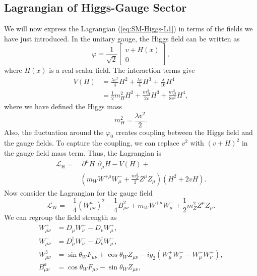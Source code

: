 \documentclass[aps,rmp,twocolumn,superscriptaddress,nofootinbib]{revtex4-2}
\begin{document}
\subsection{Lagrangian of Higgs-Gauge Sector}
We will now express the Lagrangian (\ref{eq:SM-Higgs-L1}) in terms of the fields we have just introduced.
In the unitary gauge, the Higgs field can be written as
\begin{equation}
	\varphi = \frac{1}{\sqrt 2} \begin{bmatrix}
		v + H(x) \\ 0
	\end{bmatrix},
\end{equation}
where $H(x)$ is a real scalar field.
The interaction terms give
\begin{equation}
\begin{aligned}
	V(H) &= \frac{\lambda v^2}{4} H^2 + \frac{\lambda v}{4}H^3 + \frac{\lambda}{16}H^4 \\
	&= \frac{1}{2}m_H^2 H^2 + \frac{m_H^2}{2v} H^3 + \frac{m_H^2}{8v^2}H^4,
\end{aligned} 
\end{equation}
where we have defined the Higgs mass
\begin{equation}
	m_H^2 = \frac{\lambda v^2}{2}.
\end{equation}
Also, the fluctuation around the $\varphi_0$ creates coupling between the Higgs field and the gauge fields.
To capture the coupling, we can replace $v^2$ with $(v+H)^2$ in the gauge field mass term.
Thus, the Lagrangian is
\begin{equation*}
\begin{aligned}
	\mathcal L_{\mathrm{H}} =&\ \partial^\mu H^\dagger \partial_\mu H - V(H) +  \\
	& \left(m_W W^{+\mu} W_\mu^-+\frac{m_Z^2}{2} Z^\mu Z_\mu \right) \left(H^2+2vH \right).
\end{aligned}
\end{equation*}
Now consider the Lagrangian for the gauge field
\begin{equation*}
	\mathcal L_\mathrm{W} = -\frac{1}{4}(W^a_{\mu\nu})^2 - \frac{1}{4}B_{\mu\nu}^2 + m_W W^{+\mu} W_\mu^- + \frac{1}{2}m_Z^2 Z^\mu Z_\mu.
\end{equation*}
We can regroup the field strength as
\begin{equation*}
\begin{aligned}
	W^+_{\mu\nu} &= D_\mu W_\nu^+ - D_\nu W^+_\mu, \\
	W^-_{\mu\nu} &= D_\mu^\dagger W_\nu^- - D_\nu^\dagger W^-_\mu, \\
	W^3_{\mu\nu} &= \sin{\theta_W} F_{\mu\nu} + \cos{\theta_W}Z_{\mu\nu} -ig_2(W^+_\mu W^-_\nu - W_\mu^- W_\nu^+), \\
	B^a_{\mu\nu} &= \cos{\theta_W} F_{\mu\nu} - \sin{\theta_W} Z_{\mu\nu},
\end{aligned}
\end{equation*}
\end{document}
